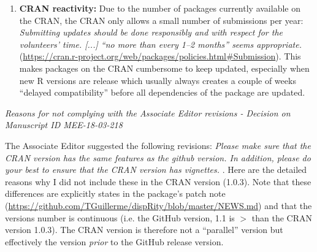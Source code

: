 \documentclass[12pt,letterpaper]{article}
\renewcommand{\subsection}[1]{%
\bigskip
\begin{center}
\begin{large}
\normalfont\itshape #1
\end{large}
\end{center}}
\begin{document}
\begin{enumerate}
\item{\textbf{CRAN reactivity:}}
Due to the number of packages currently available on the CRAN, the CRAN only allows a small number of submissions per year: \textit{Submitting updates should be done responsibly and with respect for the volunteers’ time. [...] ``no more than every 1--2 months'' seems appropriate.} (\url{https://cran.r-project.org/web/packages/policies.html#Submission}).
This makes packages on the CRAN cumbersome to keep updated, especially when new R versions are release which usually always creates a couple of weeks ``delayed compatibility'' before all dependencies of the package are updated.

\end{enumerate}

\subsection{Reasons for not complying with the Associate Editor revisions - Decision on Manuscript ID MEE-18-03-218}

The Associate Editor suggested the following revisions: \textit{Please make sure that the CRAN version has the same features as the github version. In addition, please do your best to ensure that the CRAN version has vignettes.
}.
Here are the detailed reasons why I did not include these in the CRAN version (1.0.3).
Note that these differences are explicitly states in the package's patch note (\url{https://github.com/TGuillerme/dispRity/blob/master/NEWS.md}) and that the versions number is continuous (i.e. the GitHub version, 1.1 is $>$ than the CRAN version 1.0.3).
The CRAN version is therefore not a ``parallel'' version but effectively the version \textit{prior} to the GitHub release version.
\end{document}
